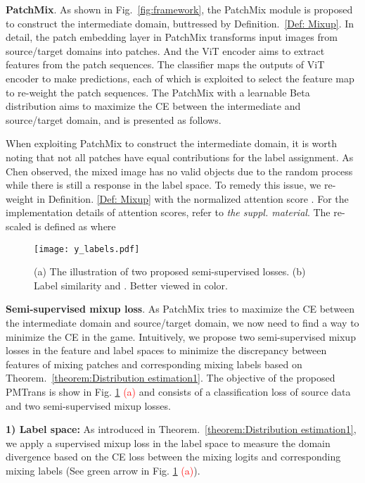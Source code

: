 \documentclass[10pt,twocolumn,letterpaper, ]{article}
\begin{document}
\noindent \textbf{PatchMix}.
As shown in Fig.~\ref{fig:framework}, the PatchMix module is proposed to construct the intermediate domain, buttressed by Definition.~\ref{Def: Mixup}. In detail, the patch embedding layer in PatchMix transforms input images from source/target domains into patches. And the ViT encoder aims to extract features from the patch sequences. The classifier maps the outputs of ViT encoder to make predictions, each of which is exploited to select the feature map to re-weight the patch sequences. The PatchMix with a learnable Beta distribution aims to maximize the CE between the intermediate and source/target domain, and is presented as follows.

When exploiting PatchMix to construct the intermediate domain, it is worth noting that not all patches have equal contributions for the label assignment. As Chen \etal\cite{DBLP:journals/corr/abs-2111-09833} observed, the mixed image has no valid objects due to the random process while there is still a response in the label space. 
To remedy this issue, we re-weight  in Definition. \ref{Def: Mixup} with the normalized attention score . For the implementation details of attention scores, refer to \textit{the suppl. material}. The re-scaled  is defined as 
{\setlength\abovedisplayskip{3pt}
\setlength\belowdisplayskip{3pt}
 }
where
{\setlength\abovedisplayskip{5pt}
\setlength\belowdisplayskip{3pt}
}
\begin{figure}
    \centering
    \texttt{[image: y\_labels.pdf]}
    \captionsetup{font=small}
    \vspace{-15pt}
    \caption{(a) The illustration of two proposed semi-supervised losses. (b) Label similarity  and . Better viewed in color.}
    \label{fig:align-feature}
    \vspace{-15pt}
\end{figure}
\noindent\textbf{Semi-supervised mixup loss}. 
As PatchMix tries to maximize the CE between the intermediate domain and source/target domain, we now need to find a way to minimize the CE in the game. Intuitively, we propose two semi-supervised mixup losses in the feature and label spaces to minimize the discrepancy between features of mixing patches and corresponding mixing labels based on Theorem.~\ref{theorem:Distribution estimation1}. The objective of the proposed PMTrans is show in Fig. \ref{fig:align-feature} \textcolor{red}{(a)} and consists of a classification loss of source data and two semi-supervised mixup losses.

\textbf{ 1) Label space:} As introduced in Theorem.~\ref{theorem:Distribution estimation1}, we apply a supervised mixup loss in the label space to measure the domain divergence based on the CE loss between the mixing logits and corresponding mixing labels (See \textcolor{green(pigment)}{green arrow} in Fig. \ref{fig:align-feature} \textcolor{red}{(a)}). 
{\setlength\abovedisplayskip{3pt}
\setlength\belowdisplayskip{3pt}
}
\end{document}
